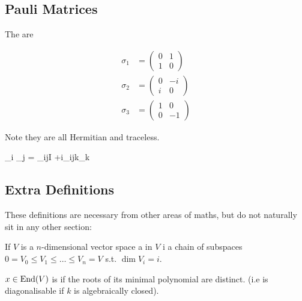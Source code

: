 \documentclass{article}
\begin{document}
\subsection{Pauli Matrices}

\begin{definition}
	The  are
	
	\begin{align*}
	\sigma_1 &= \begin{pmatrix} 0 & 1 \\ 1 & 0\end{pmatrix}  \\
	\sigma_2 &= \begin{pmatrix} 0 & -i \\ i & 0\end{pmatrix}  \\
	\sigma_3 &= \begin{pmatrix} 1 & 0 \\ 0 & -1\end{pmatrix}  
	\end{align*}
	
	Note they are all Hermitian and traceless.
\end{definition}

\begin{fact}
	\be
	\sigma_i \sigma_j = \delta_{ij}I +i\epsilon_{ijk}\sigma_k
	\ee
\end{fact}
\subsection{Extra Definitions}
These definitions are necessary from other areas of maths, but do not naturally sit in any other section:

\begin{definition}
	If $V$ is a $n$-dimensional vector space a  in $V$ i a chain of subspaces $0 = V_0 \leq V_1 \leq \dots \leq V_n=V$ s.t. $\dim V_i = i$. 
\end{definition}

\begin{definition}
	$x \in \operatorname{End}(V)$ is  if the roots of its minimal polynomial are distinct. (i.e is diagonalisable if $k$ is algebraically closed). 
\end{definition}
\end{document}
